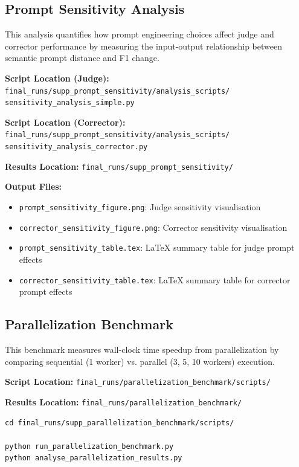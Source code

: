 \subsection{Prompt Sensitivity Analysis}

This analysis quantifies how prompt engineering choices affect judge and corrector performance by measuring the input-output relationship between semantic prompt distance and F1 change.

\textbf{Script Location (Judge):} \texttt{final\_runs/supp\_prompt\_sensitivity/analysis\_scripts/}\\
\hspace*{2em}\texttt{sensitivity\_analysis\_simple.py}

\textbf{Script Location (Corrector):} \texttt{final\_runs/supp\_prompt\_sensitivity/analysis\_scripts/}\\
\hspace*{2em}\texttt{sensitivity\_analysis\_corrector.py}

\textbf{Results Location:} \texttt{final\_runs/supp\_prompt\_sensitivity/}

\textbf{Output Files:}
\begin{itemize}[noitemsep]
    \item \texttt{prompt\_sensitivity\_figure.png}: Judge sensitivity visualisation
    \item \texttt{corrector\_sensitivity\_figure.png}: Corrector sensitivity visualisation
    \item \texttt{prompt\_sensitivity\_table.tex}: LaTeX summary table for judge prompt effects
    \item \texttt{corrector\_sensitivity\_table.tex}: LaTeX summary table for corrector prompt effects
\end{itemize}

\subsection{Parallelization Benchmark}

This benchmark measures wall-clock time speedup from parallelization by comparing sequential (1 worker) vs. parallel (3, 5, 10 workers) execution.

\textbf{Script Location:} \texttt{final\_runs/parallelization\_benchmark/scripts/}

\textbf{Results Location:} \texttt{final\_runs/parallelization\_benchmark/}

\begin{verbatim}
cd final_runs/supp_parallelization_benchmark/scripts/

python run_parallelization_benchmark.py
python analyse_parallelization_results.py
\end{verbatim}


